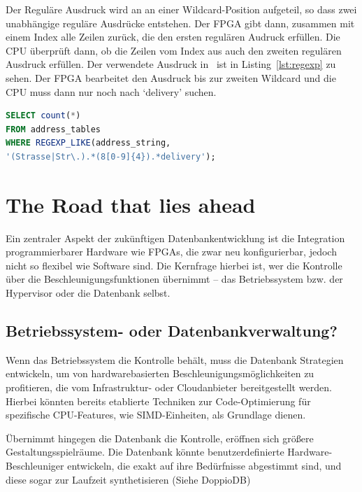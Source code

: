 \documentclass[conference]{IEEEtran}
\begin{document}
Der Reguläre Ausdruck wird an an einer Wildcard-Position aufgeteil, so dass zwei unabhängige reguläre Ausdrücke entstehen. Der FPGA gibt dann, zusammen mit einem Index
alle Zeilen zurück, die den ersten regulären Audruck erfüllen. Die CPU überprüft dann, ob die Zeilen vom Index aus auch den zweiten regulären Ausdruck erfüllen.
Der verwendete Ausdruck in~\cite{sidler_accelerating_2017} ist in Listing~\ref{lst:regexp} zu sehen. Der FPGA bearbeitet den Ausdruck bis zur zweiten
Wildcard und die CPU muss dann nur noch nach `delivery' suchen.


\begin{lstlisting}[language=SQL,frame=single,caption={Regulärer Ausdruck aus \cite{sidler_accelerating_2017}},label={lst:regexp}]
SELECT count(*) 
FROM address_tables
WHERE REGEXP_LIKE(address_string,
'(Strasse|Str\.).*(8[0-9]{4}).*delivery');
\end{lstlisting}

\section{The Road that lies ahead}
Ein zentraler Aspekt der zukünftigen Datenbankentwicklung ist die Integration programmierbarer Hardware wie FPGAs, die zwar neu konfigurierbar, jedoch nicht so flexibel wie Software sind.
Die Kernfrage hierbei ist, wer die Kontrolle über die Beschleunigungsfunktionen übernimmt -- das Betriebssystem bzw. der Hypervisor oder die Datenbank selbst.

\subsection{Betriebssystem- oder Datenbankverwaltung?}

Wenn das Betriebssystem die Kontrolle behält, muss die Datenbank Strategien entwickeln, um von hardwarebasierten Beschleunigungsmöglichkeiten zu profitieren,
die vom Infrastruktur- oder Cloudanbieter bereitgestellt werden. Hierbei könnten bereits etablierte Techniken zur Code-Optimierung für spezifische CPU-Features,
wie SIMD-Einheiten, als Grundlage dienen.

Übernimmt hingegen die Datenbank die Kontrolle, eröffnen sich größere Gestaltungsspielräume. Die Datenbank könnte benutzerdefinierte Hardware-Beschleuniger entwickeln,
die exakt auf ihre Bedürfnisse abgestimmt sind, und diese sogar zur Laufzeit synthetisieren (Siehe DoppioDB)
\end{document}
